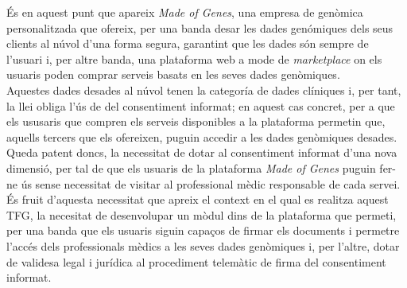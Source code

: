 \newline És en aquest punt que apareix \textit{Made of Genes}\cite{mog}, una empresa de genòmica personalitzada que ofereix, per una banda desar les dades genómiques dels seus clients al núvol d'una forma segura, garantint que les dades són sempre de l'usuari i, per altre banda, una plataforma web a mode de \textit{marketplace} on els usuaris poden comprar serveis basats en les seves dades genòmiques.\\
\newline Aquestes dades desades al núvol tenen la categoría de dades clíniques i, per tant, la llei obliga l'ús de del consentiment informat; en aquest cas concret, per a que els ususaris que compren els serveis disponibles a la plataforma permetin que, aquells tercers que els ofereixen, puguin accedir a les dades genòmiques desades.\\
\newline Queda patent doncs, la necessitat de dotar al consentiment informat d'una nova dimensió, per tal de que els usuaris de la plataforma \textit{Made of Genes}\cite{mog} puguin fer-ne ús sense necessitat de visitar al professional mèdic responsable de cada servei.\\
\newline És fruit d'aquesta necessitat que apreix el context en el qual es realitza aquest TFG, la necesitat de desenvolupar un mòdul dins de la plataforma que permeti, per una banda que els usuaris siguin capaços de  firmar els documents i permetre l'accés dels professionals mèdics a les seves dades genòmiques i, per l'altre, dotar de validesa legal i jurídica al procediment telemàtic de firma del consentiment informat.



